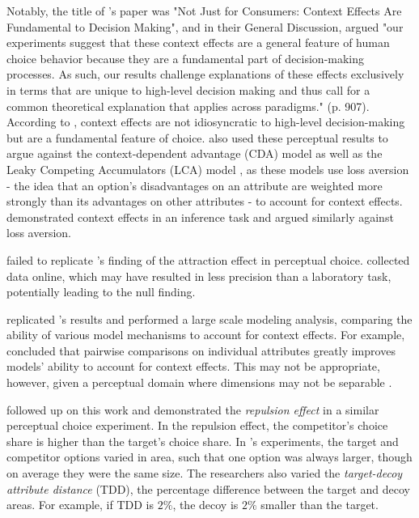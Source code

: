 Notably, the title of \textcite{trueblood2013not}'s paper was "Not Just for Consumers: Context Effects Are Fundamental to Decision Making", and in their General Discussion, \textcite{trueblood2013not} argued "our experiments suggest that these context effects are a general feature of human choice behavior because they are a fundamental part of decision-making processes. As such, our results challenge explanations of these effects exclusively in terms that are unique to high-level decision making and thus call for a common theoretical explanation that applies across paradigms." (p. 907). According to \textcite{trueblood2013not}, context effects are not idiosyncratic to high-level decision-making but are a fundamental feature of choice. \textcite{trueblood2013not} also used these perceptual results to argue against the context-dependent advantage (CDA) model \parencite{tversky1993context} as well as the Leaky Competing Accumulators (LCA) model \parencite{usherLossAversionInhibition2004a}, as these models use loss aversion  - the idea that an option's disadvantages on an attribute are weighted more strongly than its advantages on other attributes - to account for context effects. \textcite{truebloodMultialternativeContextEffects2012} demonstrated context effects in an inference task and argued similarly against loss aversion.

\textcite{frederickLimitsAttraction2014b} failed to replicate \textcite{trueblood2013not}'s finding of the attraction effect in perceptual choice. \textcite{frederickLimitsAttraction2014b} collected data online, which may have resulted in less precision than a laboratory task, potentially leading to the null finding.

\textcite{turnerCompetingTheoriesMultialternative2018a} replicated \textcite{trueblood2013not}'s results and performed a large scale modeling analysis, comparing the ability of various model mechanisms to account for context effects. For example, \textcite{turnerCompetingTheoriesMultialternative2018a} concluded that pairwise comparisons on individual attributes greatly improves models' ability to account for context effects. This may not be appropriate, however, given a perceptual domain where dimensions may not be separable \parencite{ashbyVarietiesPerceptualIndependence1986a}. 

\textcite{spektorWhenGoodLooks2018b} followed up on this work and demonstrated the \textit{repulsion effect} in a similar perceptual choice experiment. In the repulsion effect, the competitor's choice share is higher than the target's choice share. In \textcite{spektorWhenGoodLooks2018b}'s experiments, the target and competitor options varied in area, such that one option was always larger, though on average they were the same size. The researchers also varied the \textit{target-decoy attribute distance} (TDD), the percentage difference between the target and decoy areas. For example, if TDD is $2\%$, the decoy is $2\%$ smaller than the target. 

